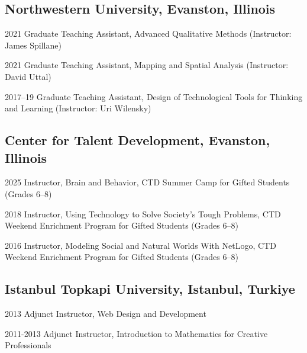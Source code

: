 \documentclass[11pt,letterpaper]{report} %
\begin{document}
    \subsection*{Northwestern University, Evanston, Illinois}

    \begin{tablist}

        \item[2021] \tab{}Graduate Teaching Assistant, Advanced Qualitative Methods (Instructor: James Spillane)

        \item[2021] \tab{}Graduate Teaching Assistant, Mapping and Spatial Analysis (Instructor: David Uttal)

        \item[2017--19] \tab{}Graduate Teaching Assistant, Design of Technological Tools for Thinking and Learning (Instructor: Uri Wilensky)

    \end{tablist}

    \subsection*{Center for Talent Development, Evanston, Illinois}

    \begin{tablist}

        \item[2025] \tab{}Instructor, Brain and Behavior, CTD Summer Camp for Gifted Students (Grades 6--8)

        \item[2018] \tab{}Instructor, Using Technology to Solve Society's Tough Problems, CTD Weekend Enrichment Program for Gifted Students (Grades 6--8)

        \item[2016] \tab{}Instructor, Modeling Social and Natural Worlds With NetLogo, CTD Weekend Enrichment Program for Gifted Students (Grades 6--8)

    \end{tablist}

    \subsection*{Istanbul Topkapi University, Istanbul, Turkiye}

    \begin{tablist}

        \item[2013] \tab{}Adjunct Instructor, Web Design and Development

        \item[2011-2013] \tab{}Adjunct Instructor, Introduction to Mathematics for Creative Professionals

    \end{tablist}
\end{document}
